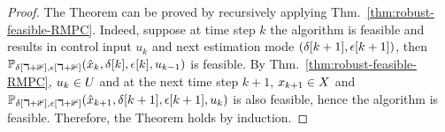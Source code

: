 \begin{proof}
The Theorem can be proved by recursively applying Thm.~\ref{thm:robust-feasible-RMPC}.
Indeed, suppose at time step $k$ the algorithm
is feasible and results in control input $u_{k}$ and next estimation
mode $\left(\delta[k+1],\epsilon[k+1]\right)$, then $\mathbb{P_{\delta[k+1],\epsilon[k+1]}}(\hat{x}_{k},\delta[k],\epsilon[k],u_{k-1})$
is feasible. By Thm.~\ref{thm:robust-feasible-RMPC}, $u_{k}\in U$ and
at the next time step $k+1$, $x_{k+1}\in X$ and $\mathbb{P_{\delta[k+1],\epsilon[k+1]}}(\hat{x}_{k+1},\delta[k+1],\epsilon[k+1],u_{k})$
is also feasible, hence the algorithm is feasible.
Therefore, the Theorem holds by induction.
\end{proof}


